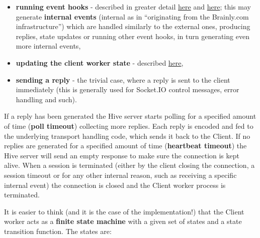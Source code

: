 \documentclass[a4paper]{article}
\begin{document}
\begin{itemize}
\item \textbf{running event hooks} - described in greater detail \hyperref[sec-7-1-4]{here} and \hyperref[sec-9-2]{here}; this may generate \textbf{internal events} (internal as in ``originating from the Brainly.com infrastructure'') which are handled similarly to the external ones, producing replies, state updates or running other event hooks, in turn generating even more internal events,
\item \textbf{updating the client worker state} - described \hyperref[sec-7-1-5]{here},
\item \textbf{sending a reply} - the trivial case, where a reply is sent to the client immediately (this is generally used for Socket.IO control messages, error handling and such).
\end{itemize}

\noindent
If a reply has been generated the Hive server starts polling for a specified amount of time (\textbf{poll timeout}) collecting more replies. Each reply is encoded and fed to the underlying transport handling code, which sends it back to the Client.
If no replies are generated for a specified amount of time (\textbf{heartbeat timeout}) the Hive server will send an empty response to make sure the connection is kept alive.
When a session is terminated (either by the client closing the connection, a session timeout or for any other internal reason, such as receiving a specific internal event) the connection is closed and the Client worker process is terminated.

It is easier to think (and it is the case of the implementation!) that the Client worker acts as a \textbf{finite state machine} with a given set of states and a state transition function. The states are:
\end{document}
